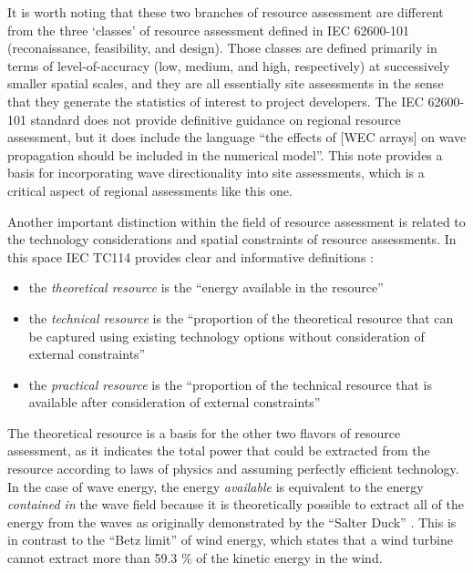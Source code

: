 It is worth noting that these two branches of resource assessment are different from the three `classes' of resource assessment defined in IEC 62600-101 (reconaissance, feasibility, and design). Those classes are defined primarily in terms of level-of-accuracy (low, medium, and high, respectively) at successively smaller spatial scales, and they are all essentially site assessments in the sense that they generate the statistics of interest to project developers.
The IEC 62600-101 standard does not provide definitive guidance on regional resource assessment, but it does include the language ``the effects of [WEC arrays] on wave propagation should be included in the numerical model''. This note provides a basis for incorporating wave directionality into site assessments, which is a critical aspect of regional assessments like this one.

Another important distinction within the field of resource assessment is related to the technology considerations and spatial constraints of resource assessments. In this space IEC TC114 provides clear and informative definitions \citep{internationalelectrotechnicalcommissionPartTerminologyEdition2020}:
\begin{itemize}
  \item the {\it theoretical resource} is the ``energy available in the resource''
  \item the {\it technical resource} is the ``proportion of the theoretical resource that can be captured using existing technology options without consideration of external constraints''
  \item the {\it practical resource} is the ``proportion of the technical resource that is available after consideration of external constraints''
\end{itemize}

The theoretical resource is a basis for the other two flavors of resource assessment, as it indicates the total power that could be extracted from the resource according to laws of physics and assuming perfectly efficient technology. In the case of wave energy, the energy {\em available} is equivalent to the energy {\em contained in} the wave field because it is theoretically possible to extract all of the energy from the waves as originally demonstrated by the ``Salter Duck'' \citep{salterRecentProgressDucks1980}. This is in contrast to the ``Betz limit'' of wind energy, which states that a wind turbine cannot extract more than 59.3 \% of the kinetic energy in the wind.

